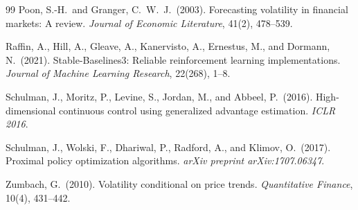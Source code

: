 \documentclass[12pt,a4paper]{article}
\begin{document}
\begin{thebibliography}{99}
Poon, S.-H.\ and Granger, C.\ W.\ J.\ (2003).
Forecasting volatility in financial markets: A review.
\textit{Journal of Economic Literature}, 41(2), 478--539.

Raffin, A., Hill, A., Gleave, A., Kanervisto, A., Ernestus, M., and
Dormann, N.\ (2021).
Stable-Baselines3: Reliable reinforcement learning implementations.
\textit{Journal of Machine Learning Research}, 22(268), 1--8.

Schulman, J., Moritz, P., Levine, S., Jordan, M., and Abbeel, P.\ (2016).
High-dimensional continuous control using generalized advantage estimation.
\textit{ICLR 2016}.

Schulman, J., Wolski, F., Dhariwal, P., Radford, A., and Klimov, O.\ (2017).
Proximal policy optimization algorithms.
\textit{arXiv preprint arXiv:1707.06347}.

Zumbach, G.\ (2010).
Volatility conditional on price trends.
\textit{Quantitative Finance}, 10(4), 431--442.

\end{thebibliography}
\end{document}
